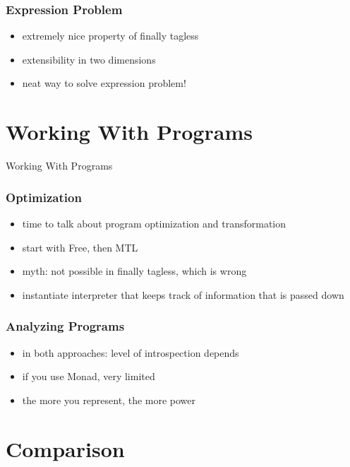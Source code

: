 \documentclass[aspectratio=169, hyperref={colorlinks, linkcolor=beamer@centricgreen}, urlcolor=links]{beamer}
\begin{document}
\begin{frame}
  \frametitle{Expression Problem}
  \begin{itemize}
  \item extremely nice property of finally tagless
  \item extensibility in two dimensions
  \item neat way to solve expression problem!
  \end{itemize}
\end{frame}

\section{Working With Programs}\label{sec:working-with-programs}

\begin{frame}
  \begin{center}
    \Huge
    Working With Programs
  \end{center}
\end{frame}

\begin{frame}
  \frametitle{Optimization}
  \begin{itemize}
  \item time to talk about program optimization and transformation
  \item start with Free, then MTL
  \item myth: not possible in finally tagless, which is wrong
  \item instantiate interpreter that keeps track of information that is passed down
  \end{itemize}
\end{frame}

\begin{frame}
  \frametitle{Analyzing Programs}
  \begin{itemize}
  \item in both approaches: level of introspection depends
  \item if you use Monad, very limited
  \item the more you represent, the more power
  \end{itemize}
\end{frame}

\section{Comparison}\label{sec:comparison}
\end{document}
